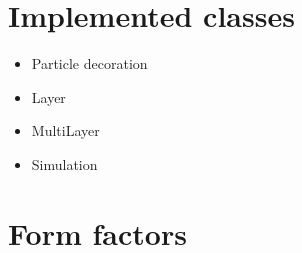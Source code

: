 \chapter{Implemented classes}

\begin{itemize}
\item Particle decoration
\item Layer
\item MultiLayer
\item Simulation
\end{itemize}

\chapter{Form factors}

